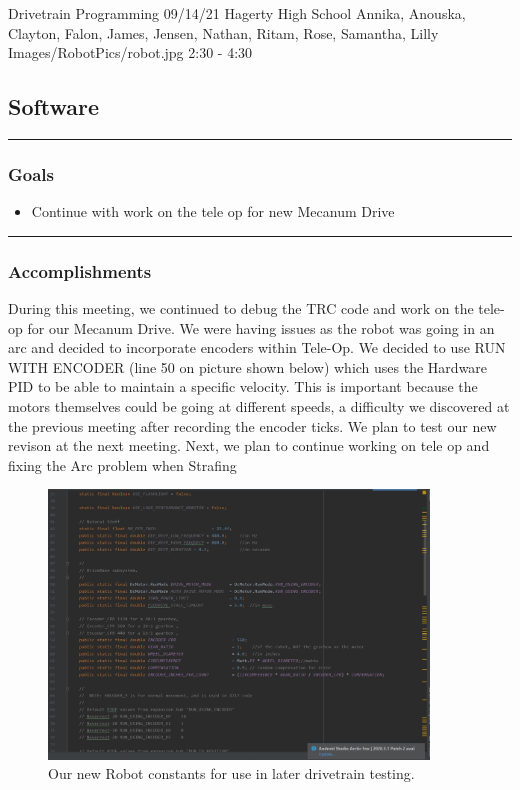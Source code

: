 \insertmeeting 
	{Drivetrain Programming} 
	{09/14/21}
	{Hagerty High School}
	{Annika, Anouska, Clayton, Falon, James, Jensen, Nathan, Ritam, Rose, Samantha, Lilly}
	{Images/RobotPics/robot.jpg}
	{2:30 - 4:30}
	
\subsection*{Software}
\noindent\hfil\rule{\textwidth}{.4pt}\hfil
\subsubsection*{Goals}
\begin{itemize}
    \item Continue with work on the tele op for new Mecanum Drive 

\end{itemize} 

\noindent\hfil\rule{\textwidth}{.4pt}\hfil

\subsubsection*{Accomplishments}
During this meeting, we continued to debug the TRC code and work on the tele-op for our Mecanum Drive. We were having issues as the robot was going in an arc and decided to incorporate encoders within Tele-Op. We decided to use RUN WITH ENCODER (line 50 on picture shown below) which uses the Hardware PID to be able to maintain a specific velocity. This is important because the motors themselves could be going at different speeds, a difficulty we discovered at the previous meeting after recording the encoder ticks. We plan to test our new revison at the next meeting. Next, we plan to continue working on tele op and fixing the Arc problem when Strafing

\begin{figure}[htp]
\centering
\includegraphics[width=0.9\textwidth, angle=0]{Meetings/September/09-14-21/09-14-21 1.JPG}
\caption{Our new Robot constants for use in later drivetrain testing.}
\label{fig:pic1}
\end{figure}

